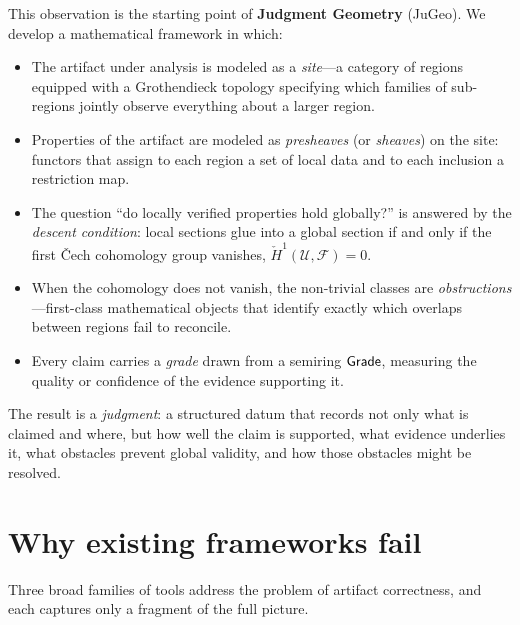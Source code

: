 This observation is the starting point of \textbf{Judgment Geometry}
(JuGeo).  We develop a mathematical framework in which:

\begin{itemize}
\item The artifact under analysis is modeled as a \emph{site}---a
  category of regions equipped with a Grothendieck topology specifying
  which families of sub-regions jointly observe everything about a
  larger region.

\item Properties of the artifact are modeled as \emph{presheaves} (or
  \emph{sheaves}) on the site: functors that assign to each region a
  set of local data and to each inclusion a restriction map.

\item The question ``do locally verified properties hold globally?''
  is answered by the \emph{descent condition}: local sections glue
  into a global section if and only if the first \v{C}ech cohomology
  group vanishes, $\check{H}^1(\mathcal{U}, \mathcal{F}) = 0$.

\item When the cohomology does not vanish, the non-trivial classes are
  \emph{obstructions}---first-class mathematical objects that identify
  exactly which overlaps between regions fail to reconcile.

\item Every claim carries a \emph{grade} drawn from a semiring
  $\mathsf{Grade}$, measuring the quality or confidence of the evidence
  supporting it.
\end{itemize}

The result is a \emph{judgment}: a structured datum that records not
only what is claimed and where, but how well the claim is supported,
what evidence underlies it, what obstacles prevent global validity, and
how those obstacles might be resolved.


\section{Why existing frameworks fail}
\label{sec:intro:existing}

Three broad families of tools address the problem of artifact
correctness, and each captures only a fragment of the full picture.

